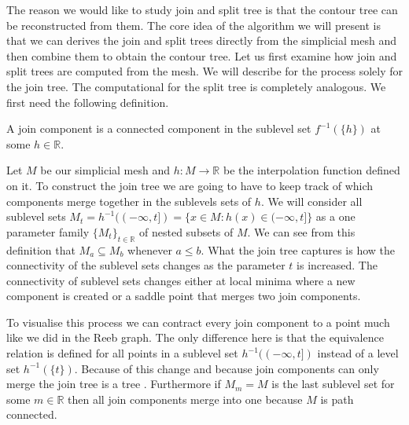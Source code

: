 The reason we would like to study join and split tree is that the contour tree can be reconstructed from them. The core idea of the algorithm we will present is that we can derives the join and split trees directly from the simplicial mesh and then combine them to obtain the contour tree. Let us first examine how join and split trees are computed from the mesh. We will describe for the process solely for the join tree. The computational for the split tree is completely analogous.  We first need the following definition.

\begin{defn} A join component is a connected component in the sublevel set $f^{-1}(\{h\})$ at some $h \in \mathbb{R}$.  \end{defn}

Let $M$ be our simplicial mesh and $h : M \to \mathbb{R}$ be the interpolation function defined on it. To construct the join tree we are going to have to keep track of which components merge together in the sublevels sets of $h$. We will consider all sublevel sets $M_t = h^{-1}((-\infty, t]) = \{x \in M : h(x) \in (-\infty, t] \}$ as a one parameter family $\{M_t\}_{t \in \mathbb{R}}$ of nested subsets of $M$. We can see from this definition that $M_a \subseteq M_b$ whenever $a \le b$. What the join tree captures is how the connectivity of the sublevel sets changes as the parameter $t$ is increased. The connectivity of sublevel sets changes either at local minima where a new component is created or a saddle point that merges two join components.


To visualise this process we can contract every join component to a point much like we did in the Reeb graph. The only difference here is that the equivalence relation is defined for all points in a sublevel set $h^{-1}((-\infty, t])$ instead of a level set $h^{-1}(\{t\})$. Because of this change and because join components can only merge the join tree is a tree \cite{comp-topo}. Furthermore if $M_m = M$ is the last sublevel set for some $m \in \mathbb{R}$ then all join components merge into one because $M$ is path connected.

